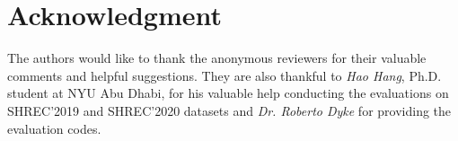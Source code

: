 \documentclass[10pt,journal,compsoc]{IEEEtran}
\begin{document}
\section*{Acknowledgment}
The authors would like to thank the anonymous reviewers for their valuable comments and helpful suggestions. They are also thankful to \textit{Hao Hang}, Ph.D. student at NYU Abu Dhabi, for his valuable help conducting the evaluations on SHREC'2019 and SHREC'2020 datasets and \textit{Dr. Roberto Dyke} for providing the evaluation codes.


%





\end{document}
